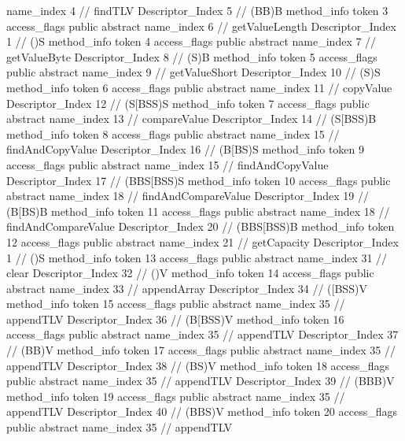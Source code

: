 {{{{{					name_index	4		// findTLV
					Descriptor_Index	5		// (BB)B
				}
				method_info {
					token	3
					access_flags	public abstract
					name_index	6		// getValueLength
					Descriptor_Index	1		// ()S
				}
				method_info {
					token	4
					access_flags	public abstract
					name_index	7		// getValueByte
					Descriptor_Index	8		// (S)B
				}
				method_info {
					token	5
					access_flags	public abstract
					name_index	9		// getValueShort
					Descriptor_Index	10		// (S)S
				}
				method_info {
					token	6
					access_flags	public abstract
					name_index	11		// copyValue
					Descriptor_Index	12		// (S[BSS)S
				}
				method_info {
					token	7
					access_flags	public abstract
					name_index	13		// compareValue
					Descriptor_Index	14		// (S[BSS)B
				}
				method_info {
					token	8
					access_flags	public abstract
					name_index	15		// findAndCopyValue
					Descriptor_Index	16		// (B[BS)S
				}
				method_info {
					token	9
					access_flags	public abstract
					name_index	15		// findAndCopyValue
					Descriptor_Index	17		// (BBS[BSS)S
				}
				method_info {
					token	10
					access_flags	public abstract
					name_index	18		// findAndCompareValue
					Descriptor_Index	19		// (B[BS)B
				}
				method_info {
					token	11
					access_flags	public abstract
					name_index	18		// findAndCompareValue
					Descriptor_Index	20		// (BBS[BSS)B
				}
				method_info {
					token	12
					access_flags	public abstract
					name_index	21		// getCapacity
					Descriptor_Index	1		// ()S
				}
				method_info {
					token	13
					access_flags	public abstract
					name_index	31		// clear
					Descriptor_Index	32		// ()V
				}
				method_info {
					token	14
					access_flags	public abstract
					name_index	33		// appendArray
					Descriptor_Index	34		// ([BSS)V
				}
				method_info {
					token	15
					access_flags	public abstract
					name_index	35		// appendTLV
					Descriptor_Index	36		// (B[BSS)V
				}
				method_info {
					token	16
					access_flags	public abstract
					name_index	35		// appendTLV
					Descriptor_Index	37		// (BB)V
				}
				method_info {
					token	17
					access_flags	public abstract
					name_index	35		// appendTLV
					Descriptor_Index	38		// (BS)V
				}
				method_info {
					token	18
					access_flags	public abstract
					name_index	35		// appendTLV
					Descriptor_Index	39		// (BBB)V
				}
				method_info {
					token	19
					access_flags	public abstract
					name_index	35		// appendTLV
					Descriptor_Index	40		// (BBS)V
				}
				method_info {
					token	20
					access_flags	public abstract
					name_index	35		// appendTLV
}}}}}
